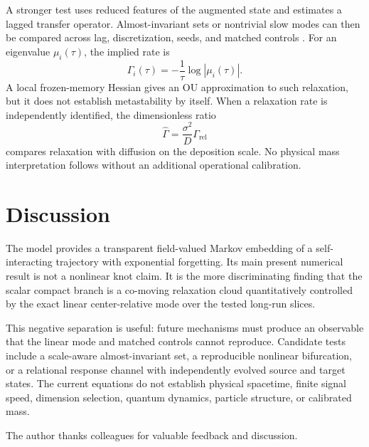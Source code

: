 \documentclass[reprint,amsmath,amssymb,aps,prd,nofootinbib,floatfix]{revtex4-2}
\begin{document}
A stronger test uses reduced features of the augmented state and estimates a
lagged transfer operator.
Almost-invariant sets or nontrivial slow modes can then be compared across
lag, discretization, seeds, and matched controls
\cite{FroylandLloydSantitissadeekorn2010,NoeNuske2013,
NoeWuPrinzPlattner2013}.
For an eigenvalue $\mu_i(\tau)$, the implied rate is
\begin{equation}
\Gamma_i(\tau)=-\frac{1}{\tau}\log|\mu_i(\tau)|.
\end{equation}
A local frozen-memory Hessian gives an OU approximation to such relaxation,
but it does not establish metastability by itself.
When a relaxation rate is independently identified, the dimensionless ratio
\begin{equation}
\widehat{\Gamma}=\frac{\sigma^2}{D}\Gamma_{\mathrm{rel}}
\end{equation}
compares relaxation with diffusion on the deposition scale.
No physical mass interpretation follows without an additional operational
calibration.

\section{Discussion}

The model provides a transparent field-valued Markov embedding of a
self-interacting trajectory with exponential forgetting.
Its main present numerical result is not a nonlinear knot claim.
It is the more discriminating finding that the scalar compact branch is a
co-moving relaxation cloud quantitatively controlled by the exact linear
center-relative mode over the tested long-run slices.

This negative separation is useful: future mechanisms must produce an
observable that the linear mode and matched controls cannot reproduce.
Candidate tests include a scale-aware almost-invariant set, a reproducible
nonlinear bifurcation, or a relational response channel with independently
evolved source and target states.
The current equations do not establish physical spacetime, finite signal
speed, dimension selection, quantum dynamics, particle structure, or
calibrated mass.

\begin{acknowledgments}
The author thanks colleagues for valuable feedback and discussion.
\end{acknowledgments}



\end{document}

